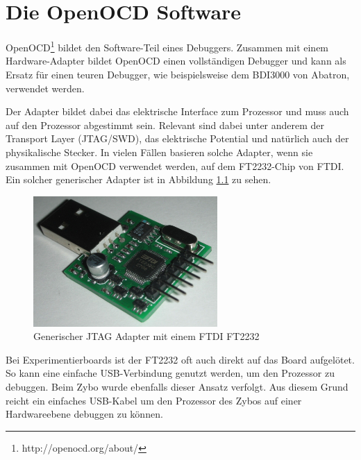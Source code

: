\chapter{Die OpenOCD Software}
OpenOCD\footnote{http://openocd.org/about/} bildet den Software-Teil eines Debuggers.
Zusammen mit einem Hardware-Adapter bildet OpenOCD einen vollständigen Debugger und kann als Ersatz für einen teuren Debugger, wie beispielsweise dem BDI3000 von Abatron, verwendet werden.

Der Adapter bildet dabei das elektrische Interface zum Prozessor und muss auch auf den Prozessor abgestimmt sein.
Relevant sind dabei unter anderem der Transport Layer (JTAG/SWD), das elektrische Potential und natürlich auch der physikalische Stecker.
In vielen Fällen basieren solche Adapter, wenn sie zusammen mit OpenOCD verwendet werden, auf dem FT2232-Chip von FTDI.
Ein solcher generischer Adapter ist in Abbildung \ref{fig:GenerischerFT2232Adapter} zu sehen.

\begin{figure}[htbp]
	\centering
		\includegraphics[width=7cm,keepaspectratio]{images/JTAGAdapter.jpg}
	\caption[Generischer JTAG Adapter mit einem FTDI FT2232]{Generischer JTAG Adapter mit einem FTDI FT2232\footnotemark}
	\label{fig:GenerischerFT2232Adapter}
\end{figure}

Bei Experimentierboards ist der FT2232 oft auch direkt auf das Board aufgelötet.
So kann eine einfache USB-Verbindung genutzt werden, um den Prozessor zu debuggen.
Beim Zybo wurde ebenfalls dieser Ansatz verfolgt.
Aus diesem Grund reicht ein einfaches USB-Kabel um den Prozessor des Zybos auf einer Hardwareebene debuggen zu können.



